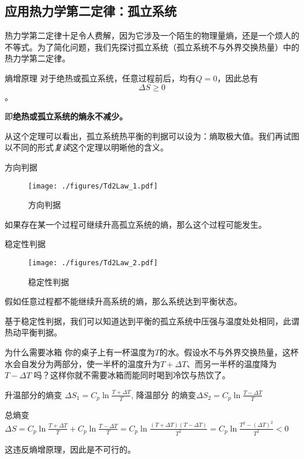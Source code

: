 \subsection{应用热力学第二定律：孤立系统}
热力学第二定律十足令人费解，因为它涉及一个陌生的物理量熵，还是一个烦人的不等式。为了简化问题，我们先探讨孤立系统（孤立系统不与外界交换热量）中的热力学第二定律。
\begin{corollary}{熵增原理}
对于绝热或孤立系统，任意过程前后，均有$Q=0$，因此总有 $$\Delta S \ge 0$$。

即\textbf{绝热或孤立系统的熵永不减少。}
\end{corollary}
从这个定理可以看出，孤立系统热平衡的判据可以设为：熵取极大值。我们再试图以不同的形式\textsl{复读}这个定理以明晰他的含义。

\begin{corollary}{方向判据}
\begin{figure}[ht]
\centering
\texttt{[image: ./figures/Td2Law\_1.pdf]}
\caption{方向判据} \label{Td2Law_fig1}
\end{figure}
如果存在某一个过程可继续升高孤立系统的熵，那么这个过程可能发生。
\end{corollary}

\begin{corollary}{稳定性判据}
\begin{figure}[ht]
\centering
\texttt{[image: ./figures/Td2Law\_2.pdf]}
\caption{稳定性判据} \label{Td2Law_fig2}
\end{figure}
假如任意过程都不能继续升高系统的熵，那么系统达到平衡状态。

基于稳定性判据，我们可以知道达到平衡的孤立系统中压强与温度处处相同，此谓热动平衡判据。
\end{corollary}

\begin{example}{为什么需要冰箱}
你的桌子上有一杯温度为$T$的水。假设水不与外界交换热量，这杯水会自发分为两部分，使一半杯的温度升为$T+\Delta T$、而另一半杯的温度降为$T-\Delta T$ 吗？这样你就不需要冰箱而能同时喝到冷饮与热饮了。

升温部分的熵变 $\Delta S_1=C_p \ln \frac{T+\Delta T}{T}$, 降温部分 的熵变$\Delta S_2=C_p \ln \frac{T-\Delta T}{T}$

总熵变 $\Delta S = C_p \ln \frac{T+\Delta T}{T} + C_p \ln \frac{T-\Delta T}{T} = C_p \ln \frac{(T+\Delta T)(T-\Delta T)}{T^2}= C_p \ln \frac{T^2 - (\Delta T)^2}{T^2}<0$

这违反熵增原理，因此是不可行的。
\end{example}

